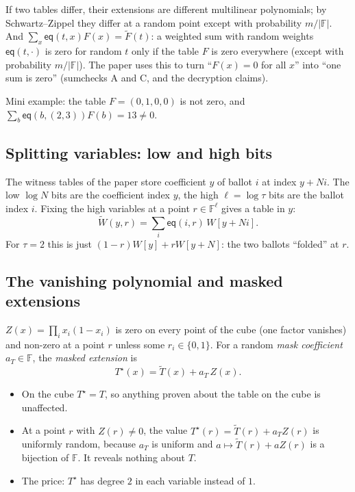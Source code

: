 \documentclass[11pt,a4paper]{article}
\newcommand{\F}{\mathbb{F}}
\newcommand{\eq}{\mathsf{eq}}
\newcommand{\mle}[1]{\widetilde{#1}}
\newcommand{\msk}[1]{#1^{\star}}
\theoremstyle{definition}
\theoremstyle{plain}
\begin{document}
\begin{why}
If two tables differ, their extensions are different multilinear polynomials; by Schwartz--Zippel
they differ at a random point except with probability $m/|\F|$. And $\sum_x\eq(t,x)F(x)=\mle F(t)$:
a weighted sum with random weights $\eq(t,\cdot)$ is zero for random $t$ only if the table $F$ is
zero everywhere (except with probability $m/|\F|$). The paper uses this to turn ``$F(x)=0$ for all
$x$'' into ``one sum is zero'' (sumchecks A and C, and the decryption claims).

Mini example: the table $F=(0,1,0,0)$ is not zero, and $\sum_b\eq(b,(2,3))F(b)=13\neq 0$.
\end{why}

\subsection{Splitting variables: low and high bits}

The witness tables of the paper store coefficient $y$ of ballot $i$ at index $y+Ni$. The low
$\log N$ bits are the coefficient index $y$, the high $\ell=\log\tau$ bits are the ballot index $i$.
Fixing the high variables at a point $r\in\F^\ell$ gives a table in $y$:
\[
  \mle W(y,r)=\sum_{i}\eq(i,r)\,W[y+Ni] .
\]
For $\tau=2$ this is just $(1-r)W[y]+rW[y+N]$: the two ballots ``folded'' at $r$.

\subsection{The vanishing polynomial and masked extensions}
\label{sec:masked}

$Z(x)=\prod_i x_i(1-x_i)$ is zero on every point of the cube (one factor vanishes) and non-zero at a
point $r$ unless some $r_i\in\{0,1\}$. For a random \emph{mask coefficient} $a_T\in\F$, the
\emph{masked extension} is
\[
  \msk T(x)=\mle T(x)+a_T\,Z(x).
\]
\begin{itemize}[leftmargin=1.3em]
\item On the cube $\msk T=T$, so anything proven about the table on the cube is unaffected.
\item At a point $r$ with $Z(r)\neq 0$, the value $\msk T(r)=\mle T(r)+a_TZ(r)$ is uniformly random,
  because $a_T$ is uniform and $a\mapsto \mle T(r)+aZ(r)$ is a bijection of $\F$. It reveals nothing
  about $T$.
\item The price: $\msk T$ has degree $2$ in each variable instead of $1$.
\end{itemize}
\end{document}
